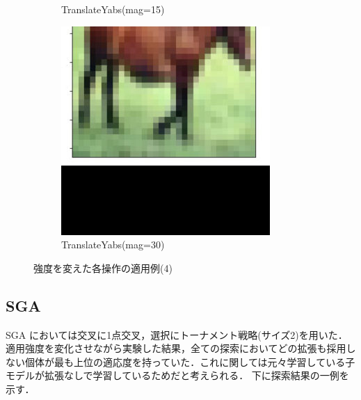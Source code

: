 \documentclass[onecolumn]{ujarticle}   %
\begin{document}
\begin{figure}[h]
\begin{subfigure}{0.3\columnwidth}
        \caption{TranslateYabs(mag=15)}
        \label{fig:TranslateYabs_15}
      \end{subfigure}
      \begin{subfigure}{0.3\columnwidth}
        \centering
        \includegraphics[width=1.0\columnwidth]{transform_test/TranslateYabs_30.png}
        \caption{TranslateYabs(mag=30)}
        \label{fig:TranslateYabs_30}
      \end{subfigure}

      \caption{強度を変えた各操作の適用例(4)}
      \label{fig:OperationsWithVariousMagnitude4}
    \end{figure}

  \subsection{SGA}
  SGA においては交叉に1点交叉，選択にトーナメント戦略(サイズ2)を用いた．適用強度を変化させながら実験した結果，全ての探索においてどの拡張も採用しない個体が最も上位の適応度を持っていた．これに関しては元々学習している子モデルが拡張なしで学習しているためだと考えられる．
  下に探索結果の一例を示す．
\end{document}
